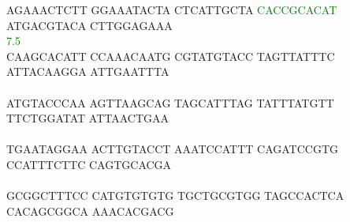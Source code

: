 \documentclass[11pt,twoside,reqno,a4paper]{article}
\begin{document}
{AGAAACTCTT	GGAAATACTA	CTCATTGCTA	\textcolor{Green}{C}\textcolor{Green}{A}\textcolor{Green}{C}\textcolor{Green}{C}\textcolor{Green}{G}\textcolor{Green}{C}\textcolor{Green}{A}\textcolor{Green}{C}\textcolor{Green}{A}\textcolor{Green}{T}	ATGACGTACA	CTTGGAGAAA	\\
\hspace*{1\charwidth}\hspace*{1\charwidth}\hspace*{1\charwidth}\hspace*{30\charwidth}\textcolor{Green}{7.5}\hspace*{1\charwidth}\hspace*{1\charwidth}\hspace*{1\charwidth}\\
CAAGCACATT	CCAAACAATG	CGTATGTACC	TAGTTATTTC	ATTACAAGGA	ATTGAATTTA	\\
\hspace*{1\charwidth}\hspace*{1\charwidth}\hspace*{1\charwidth}\hspace*{1\charwidth}\hspace*{1\charwidth}\hspace*{1\charwidth}\\
ATGTACCCAA	AGTTAAGCAG	TAGCATTTAG	TATTTATGTT	TTCTGGATAT	ATTAACTGAA	\\
\hspace*{1\charwidth}\hspace*{1\charwidth}\hspace*{1\charwidth}\hspace*{1\charwidth}\hspace*{1\charwidth}\hspace*{1\charwidth}\\
TGAATAGGAA	ACTTGTACCT	AAATCCATTT	CAGATCCGTG	CCATTTCTTC	CAGTGCACGA	\\
\hspace*{1\charwidth}\hspace*{1\charwidth}\hspace*{1\charwidth}\hspace*{1\charwidth}\hspace*{1\charwidth}\hspace*{1\charwidth}\\
GCGGCTTTCC	CATGTGTGTG	TGCTGCGTGG	TAGCCACTCA	CACAGCGGCA	AAACACGACG	\\
\hspace*{1\charwidth}\hspace*{1\charwidth}\hspace*{1\charwidth}\hspace*{1\charwidth}\hspace*{1\charwidth}\hspace*{1\charwidth}\\
}
\end{document}
